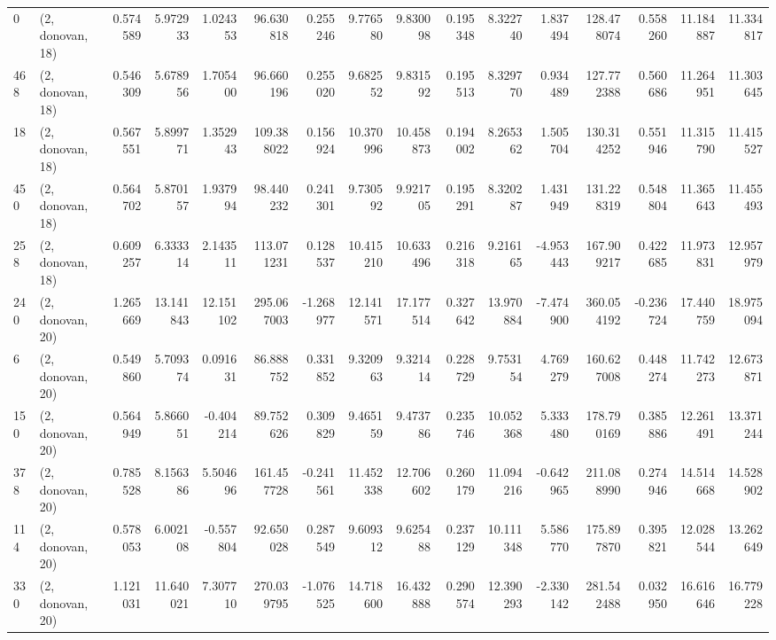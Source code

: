 \begin{tabular}{llrrrrrrrrrrrrrr}
0   &  (2, donovan, 18) &   0.574589 &   5.972933 &   1.024353 &    96.630818 &   0.255246 &   9.776580 &   9.830098 &  0.195348 &   8.322740 &   1.837494 &   128.478074 &   0.558260 &  11.184887 &  11.334817 \\
468 &  (2, donovan, 18) &   0.546309 &   5.678956 &   1.705400 &    96.660196 &   0.255020 &   9.682552 &   9.831592 &  0.195513 &   8.329770 &   0.934489 &   127.772388 &   0.560686 &  11.264951 &  11.303645 \\
18  &  (2, donovan, 18) &   0.567551 &   5.899771 &   1.352943 &   109.388022 &   0.156924 &  10.370996 &  10.458873 &  0.194002 &   8.265362 &   1.505704 &   130.314252 &   0.551946 &  11.315790 &  11.415527 \\
450 &  (2, donovan, 18) &   0.564702 &   5.870157 &   1.937994 &    98.440232 &   0.241301 &   9.730592 &   9.921705 &  0.195291 &   8.320287 &   1.431949 &   131.228319 &   0.548804 &  11.365643 &  11.455493 \\
258 &  (2, donovan, 18) &   0.609257 &   6.333314 &   2.143511 &   113.071231 &   0.128537 &  10.415210 &  10.633496 &  0.216318 &   9.216165 &  -4.953443 &   167.909217 &   0.422685 &  11.973831 &  12.957979 \\
240 &  (2, donovan, 20) &   1.265669 &  13.141843 &  12.151102 &   295.067003 &  -1.268977 &  12.141571 &  17.177514 &  0.327642 &  13.970884 &  -7.474900 &   360.054192 &  -0.236724 &  17.440759 &  18.975094 \\
6   &  (2, donovan, 20) &   0.549860 &   5.709374 &   0.091631 &    86.888752 &   0.331852 &   9.320963 &   9.321414 &  0.228729 &   9.753154 &   4.769279 &   160.627008 &   0.448274 &  11.742273 &  12.673871 \\
150 &  (2, donovan, 20) &   0.564949 &   5.866051 &  -0.404214 &    89.752626 &   0.309829 &   9.465159 &   9.473786 &  0.235746 &  10.052368 &   5.333480 &   178.790169 &   0.385886 &  12.261491 &  13.371244 \\
378 &  (2, donovan, 20) &   0.785528 &   8.156386 &   5.504696 &   161.457728 &  -0.241561 &  11.452338 &  12.706602 &  0.260179 &  11.094216 &  -0.642965 &   211.088990 &   0.274946 &  14.514668 &  14.528902 \\
114 &  (2, donovan, 20) &   0.578053 &   6.002108 &  -0.557804 &    92.650028 &   0.287549 &   9.609312 &   9.625488 &  0.237129 &  10.111348 &   5.586770 &   175.897870 &   0.395821 &  12.028544 &  13.262649 \\
330 &  (2, donovan, 20) &   1.121031 &  11.640021 &   7.307710 &   270.039795 &  -1.076525 &  14.718600 &  16.432888 &  0.290574 &  12.390293 &  -2.330142 &   281.542488 &   0.032950 &  16.616646 &  16.779228 \\

\end{tabular}

